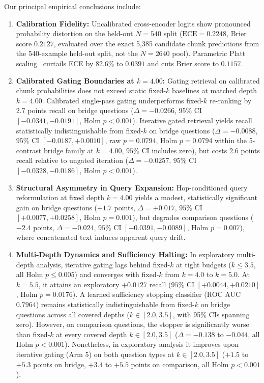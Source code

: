 \documentclass[conference]{IEEEtran}
\begin{document}
Our principal empirical conclusions include:
\begin{enumerate}
    \item \textbf{Calibration Fidelity:} Uncalibrated cross-encoder logits show pronounced probability distortion on the held-out $N=540$ split ($\text{ECE}=0.2248$, Brier score $0.2127$, evaluated over the exact 5,385 candidate chunk predictions from the 540-example held-out split, not the $N=2640$ pool). Parametric Platt scaling~\cite{platt1999probabilistic} curtails ECE by 82.6\% to $0.0391$ and cuts Brier score to $0.1157$.
    \item \textbf{Calibrated Gating Boundaries at $k=4.00$:} Gating retrieval on calibrated chunk probabilities does not exceed static fixed-$k$ baselines at matched depth $k=4.00$. Calibrated single-pass gating underperforms fixed-$k$ re-ranking by $2.7$ points recall on bridge questions ($\Delta = -0.0266$, $95\%$ CI $[-0.0341, -0.0191]$, Holm $p < 0.001$). Iterative gated retrieval yields recall statistically indistinguishable from fixed-$k$ on bridge questions ($\Delta = -0.0088$, $95\%$ CI $[-0.0187, +0.0010]$, raw $p=0.0794$, Holm $p=0.0794$ within the 5-contrast bridge family at $k=4.00$, $95\%$ CI includes zero), but costs $2.6$ points recall relative to ungated iteration ($\Delta = -0.0257$, $95\%$ CI $[-0.0328, -0.0186]$, Holm $p < 0.001$).
    \item \textbf{Structural Asymmetry in Query Expansion:} Hop-conditioned query reformulation at fixed depth $k=4.00$ yields a modest, statistically significant gain on bridge questions ($+1.7$ points, $\Delta = +0.017$, $95\%$ CI $[+0.0077, +0.0258]$, Holm $p=0.001$), but degrades comparison questions ($-2.4$ points, $\Delta = -0.024$, $95\%$ CI $[-0.0391, -0.0089]$, Holm $p=0.007$), where concatenated text induces apparent query drift.
    \item \textbf{Multi-Depth Dynamics and Sufficiency Halting:} In exploratory multi-depth analysis, iterative gating lags behind fixed-$k$ at tight budgets ($k \le 3.5$, all Holm $p \le 0.005$) and converges with fixed-$k$ from $k=4.0$ to $k=5.0$. At $k=5.5$, it attains an exploratory $+0.0127$ recall ($95\%$ CI $[+0.0044, +0.0210]$, Holm $p=0.0176$). A learned sufficiency stopping classifier (ROC AUC $0.7964$) remains statistically indistinguishable from fixed-$k$ on bridge questions across all covered depths ($k \in [2.0, 3.5]$, with 95\% CIs spanning zero). However, on comparison questions, the stopper is significantly worse than fixed-$k$ at every covered depth $k \in [2.0, 3.5]$ ($\Delta = -0.138$ to $-0.044$, all Holm $p < 0.001$). Nonetheless, in exploratory analysis it improves upon iterative gating (Arm 5) on both question types at $k \in [2.0, 3.5]$ ($+1.5$ to $+5.3$ points on bridge, $+3.4$ to $+5.5$ points on comparison, all Holm $p < 0.001$).
\end{enumerate}
\end{document}
